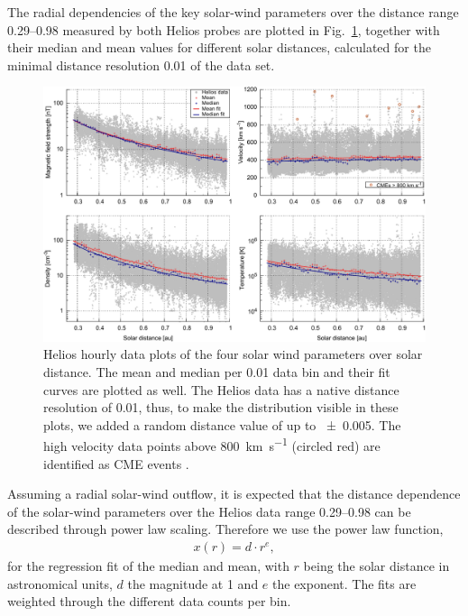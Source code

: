 \documentclass[]{aa}
\begin{document}
        The radial dependencies of the key solar-wind parameters over the distance range \SIrange{0.29}{0.98}{\au} measured by both Helios probes are plotted in Fig.~\ref{fig:radial_fit_4_thesis_light_b_skip}, together with their median and mean values for different solar distances, calculated for the minimal distance resolution \SI{0.01}{\au} of the data set.
        \begin{figure}
                \includegraphics[width=18cm]{radial_fit_4_thesis_light_b_skip.pdf}
                \caption{Helios hourly data plots of the four solar wind parameters over solar distance. The mean and median per \SI{0.01}{\au} data bin and their fit curves are plotted as well. The Helios data has a native distance resolution of \SI{0.01}{\au}, thus, to make the distribution visible in these plots, we added a random distance value of up to \SI{+-0.005}{\au}. The high velocity data points above \SI{800}{\km\per\s} (circled red) are identified as CME events \citep[e.g.,][]{Sheeley1985,Bothmer1996,Bothmer1998}.}
                \label{fig:radial_fit_4_thesis_light_b_skip}
        \end{figure}
        Assuming a radial solar-wind outflow, it is expected that the distance dependence of the solar-wind parameters over the Helios data range \SIrange{0.29}{0.98}{\au} can be described through power law scaling. Therefore we use the power law function,
        \begin{align}
                x(r) = d\cdot r^e,       \label{eq:power_function}
        \end{align}
        for the regression fit of the median and mean, with $r$ being the solar distance in astronomical units, $d$ the magnitude at \SI{1}{\au} and $e$ the exponent. The fits are weighted through the different data counts per bin.
\end{document}
